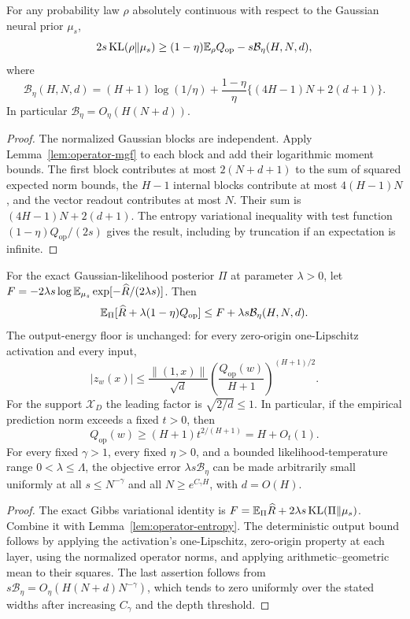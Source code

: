 \begin{lemma}
\label{lem:operator-entropy}
For any probability law $\rho$ absolutely continuous with respect to the Gaussian neural prior $\mu_s$,
\[
 2s\operatorname{KL}(\rho\|\mu_s)
 \ge(1-\eta)\mathbb E_\rho Q_{\mathrm{op}}-s\mathcal B_\eta(H,N,d),
\]
where
\[
 \mathcal B_\eta(H,N,d)
 =(H+1)\log(1/\eta)
 +\frac{1-\eta}{\eta}\{(4H-1)N+2(d+1)\}.
\]
In particular $\mathcal B_\eta=O_\eta(H(N+d))$.
\end{lemma}
\begin{proof}
The normalized Gaussian blocks are independent. Apply Lemma~\ref{lem:operator-mgf} to each block and add their logarithmic moment bounds. The first block contributes at most $2(N+d+1)$ to the sum of squared expected norm bounds, the $H-1$ internal blocks contribute at most $4(H-1)N$, and the vector readout contributes at most $N$. Their sum is $(4H-1)N+2(d+1)$. The entropy variational inequality with test function $(1-\eta)Q_{\mathrm{op}}/(2s)$ gives the result, including by truncation if an expectation is infinite.
\end{proof}

\begin{corollary}
\label{cor:operator-posterior-objective}
For the exact Gaussian-likelihood posterior $\Pi$ at parameter $\lambda>0$, let
$F=-2\lambda s\log\mathbb E_{\mu_s}\exp[-\widehat R/(2\lambda s)]$.
Then
\[
 \mathbb E_\Pi[\widehat R+\lambda(1-\eta)Q_{\mathrm{op}}]
 \le F+\lambda s\mathcal B_\eta(H,N,d).
\]
The output-energy floor is unchanged: for every zero-origin one-Lipschitz activation and every input,
\[
 |z_w(x)|\le\frac{\|(1,x)\|}{\sqrt d}
       \left(\frac{Q_{\mathrm{op}}(w)}{H+1}\right)^{(H+1)/2}.
\]
For the support $\mathcal X_D$ the leading factor is $\sqrt{2/d}\le1$. In particular, if the empirical prediction norm exceeds a fixed $t>0$, then
\[
 Q_{\mathrm{op}}(w)\ge(H+1)t^{2/(H+1)}=H+O_t(1).
\]
For every fixed $\gamma>1$, every fixed $\eta>0$, and a bounded likelihood-temperature range $0<\lambda\le\Lambda$, the objective error $\lambda s\mathcal B_\eta$ can be made arbitrarily small uniformly at all $s\le N^{-\gamma}$ and all $N\ge e^{C_\gamma H}$, with $d=O(H)$.
\end{corollary}
\begin{proof}
The exact Gibbs variational identity is
$F=\mathbb E_\Pi\widehat R+2\lambda s\operatorname{KL}(\Pi\|\mu_s)$.
Combine it with Lemma~\ref{lem:operator-entropy}. The deterministic output bound follows by applying the activation's one-Lipschitz, zero-origin property at each layer, using the normalized operator norms, and applying arithmetic--geometric mean to their squares. The last assertion follows from
$s\mathcal B_\eta=O_\eta(H(N+d)N^{-\gamma})$, which tends to zero uniformly over the stated widths after increasing $C_\gamma$ and the depth threshold.
\end{proof}

